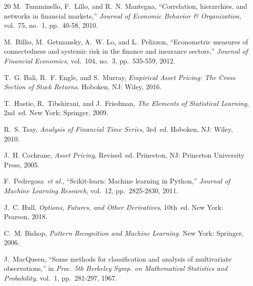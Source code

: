 \documentclass[11pt]{article}
\begin{document}
\begin{thebibliography}{20}
M.~Tumminello, F.~Lillo, and R.~N. Mantegna, ``Correlation, hierarchies, and networks in financial markets,'' \textit{Journal of Economic Behavior \& Organization}, vol.~75, no.~1, pp.~40-58, 2010.

M.~Billio, M.~Getmansky, A.~W. Lo, and L.~Pelizzon, ``Econometric measures of connectedness and systemic risk in the finance and insurance sectors,'' \textit{Journal of Financial Economics}, vol.~104, no.~3, pp.~535-559, 2012.

T.~G. Bali, R.~F. Engle, and S.~Murray, \textit{Empirical Asset Pricing: The Cross Section of Stock Returns}. Hoboken, NJ: Wiley, 2016.

T.~Hastie, R.~Tibshirani, and J.~Friedman, \textit{The Elements of Statistical Learning}, 2nd~ed. New York: Springer, 2009.

R.~S. Tsay, \textit{Analysis of Financial Time Series}, 3rd~ed. Hoboken, NJ: Wiley, 2010.

J.~H. Cochrane, \textit{Asset Pricing}, Revised~ed. Princeton, NJ: Princeton University Press, 2005.

F.~Pedregosa~\textit{et al.}, ``Scikit-learn: Machine learning in Python,'' \textit{Journal of Machine Learning Research}, vol.~12, pp.~2825-2830, 2011.

J.~C. Hull, \textit{Options, Futures, and Other Derivatives}, 10th~ed. New York: Pearson, 2018.

C.~M. Bishop, \textit{Pattern Recognition and Machine Learning}. New York: Springer, 2006.

J.~MacQueen, ``Some methods for classification and analysis of multivariate observations,'' in \textit{Proc. 5th Berkeley Symp. on Mathematical Statistics and Probability}, vol.~1, pp.~281-297, 1967.

\end{thebibliography}
\end{document}
